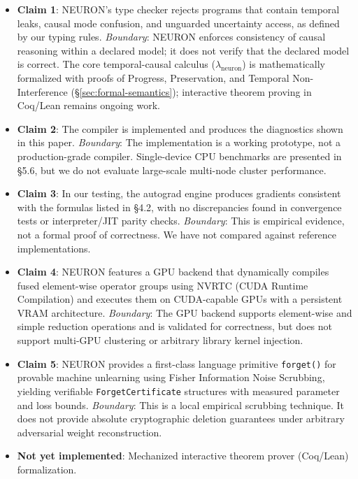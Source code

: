 \documentclass[11pt,a4paper]{article}
\begin{document}
\begin{itemize}[itemsep=2pt]
  \item \textbf{Claim 1}: NEURON's type checker rejects programs that contain temporal leaks, causal mode confusion, and unguarded uncertainty access, as defined by our typing rules. \emph{Boundary}: NEURON enforces consistency of causal reasoning within a declared model; it does not verify that the declared model is correct. The core temporal-causal calculus ($\lambda_{\text{neuron}}$) is mathematically formalized with proofs of Progress, Preservation, and Temporal Non-Interference (\S\ref{sec:formal-semantics}); interactive theorem proving in Coq/Lean remains ongoing work.
  
  \item \textbf{Claim 2}: The compiler is implemented and produces the diagnostics shown in this paper. \emph{Boundary}: The implementation is a working prototype, not a production-grade compiler. Single-device CPU benchmarks are presented in \S5.6, but we do not evaluate large-scale multi-node cluster performance.
  
  \item \textbf{Claim 3}: In our testing, the autograd engine produces gradients consistent with the formulas listed in \S4.2, with no discrepancies found in convergence tests or interpreter/JIT parity checks. \emph{Boundary}: This is empirical evidence, not a formal proof of correctness. We have not compared against reference implementations.

  \item \textbf{Claim 4}: NEURON features a GPU backend that dynamically compiles fused element-wise operator groups using NVRTC (CUDA Runtime Compilation) and executes them on CUDA-capable GPUs with a persistent VRAM architecture. \emph{Boundary}: The GPU backend supports element-wise and simple reduction operations and is validated for correctness, but does not support multi-GPU clustering or arbitrary library kernel injection.
  
  \item \textbf{Claim 5}: NEURON provides a first-class language primitive \texttt{forget()} for provable machine unlearning using Fisher Information Noise Scrubbing, yielding verifiable \texttt{ForgetCertificate} structures with measured parameter and loss bounds. \emph{Boundary}: This is a local empirical scrubbing technique. It does not provide absolute cryptographic deletion guarantees under arbitrary adversarial weight reconstruction.
  
  \item \textbf{Not yet implemented}: Mechanized interactive theorem prover (Coq/Lean) formalization.
\end{itemize}
\end{document}
